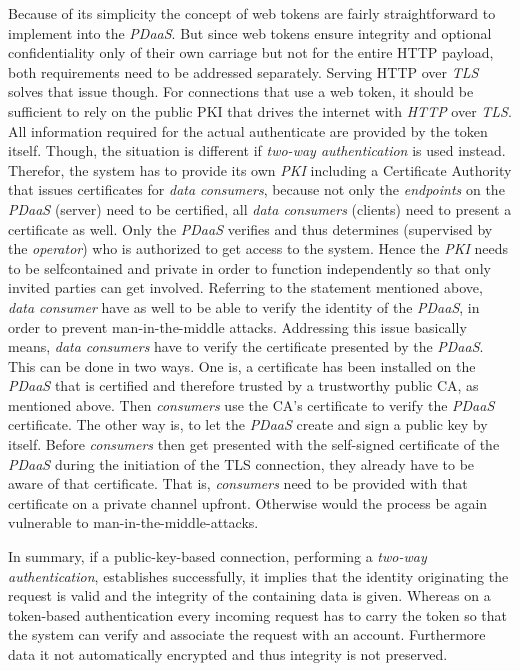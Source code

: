 \documentclass[12pt,english,a4paper,titlepage,cleardoublepage=empty,dottedtoc]{report}
\begin{document}
Because of its simplicity the concept of web tokens are fairly
straightforward to implement into the \emph{PDaaS}. But since web tokens
ensure integrity and optional confidentiality only of their own carriage
but not for the entire HTTP payload, both requirements need to be
addressed separately. Serving HTTP over \emph{TLS} solves that issue
though. For connections that use a web token, it should be sufficient to
rely on the public PKI that drives the internet with \emph{HTTP} over
\emph{TLS}. All information required for the actual authenticate are
provided by the token itself. Though, the situation is different if
\emph{two-way authentication} is used instead. Therefor, the system has
to provide its own \emph{PKI} including a Certificate Authority that
issues certificates for \emph{data consumers}, because not only the
\emph{endpoints} on the \emph{PDaaS} (server) need to be certified, all
\emph{data consumers} (clients) need to present a certificate as well.
Only the \emph{PDaaS} verifies and thus determines (supervised by the
\emph{operator}) who is authorized to get access to the system. Hence
the \emph{PKI} needs to be selfcontained and private in order to
function independently so that only invited parties can get involved.
Referring to the statement mentioned above, \emph{data consumer} have as
well to be able to verify the identity of the \emph{PDaaS}, in order to
prevent man-in-the-middle attacks. Addressing this issue basically
means, \emph{data consumers} have to verify the certificate presented by
the \emph{PDaaS}. This can be done in two ways. One is, a certificate
has been installed on the \emph{PDaaS} that is certified and therefore
trusted by a trustworthy public CA, as mentioned above. Then
\emph{consumers} use the CA's certificate to verify the \emph{PDaaS}
certificate. The other way is, to let the \emph{PDaaS} create and sign a
public key by itself. Before \emph{consumers} then get presented with
the self-signed certificate of the \emph{PDaaS} during the initiation of
the TLS connection, they already have to be aware of that certificate.
That is, \emph{consumers} need to be provided with that certificate on a
private channel upfront. Otherwise would the process be again vulnerable
to man-in-the-middle-attacks.

In summary, if a public-key-based connection, performing a \emph{two-way
authentication}, establishes successfully, it implies that the identity
originating the request is valid and the integrity of the containing
data is given. Whereas on a token-based authentication every incoming
request has to carry the token so that the system can verify and
associate the request with an account. Furthermore data it not
automatically encrypted and thus integrity is not preserved.
\end{document}
